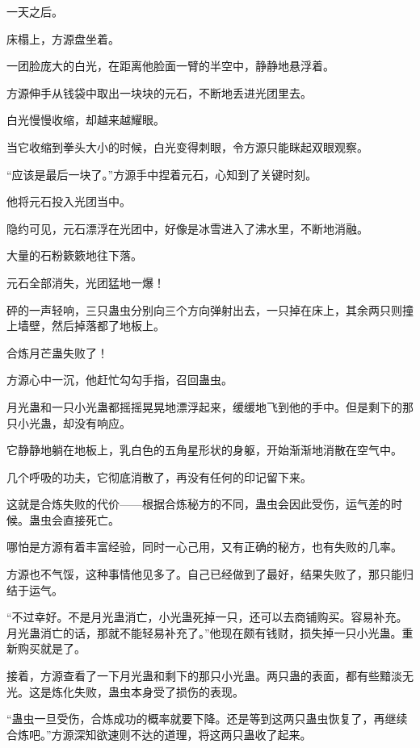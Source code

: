 
\begin{this_body}

一天之后。

床榻上，方源盘坐着。

一团脸庞大的白光，在距离他脸面一臂的半空中，静静地悬浮着。

方源伸手从钱袋中取出一块块的元石，不断地丢进光团里去。

白光慢慢收缩，却越来越耀眼。

当它收缩到拳头大小的时候，白光变得刺眼，令方源只能眯起双眼观察。

“应该是最后一块了。”方源手中捏着元石，心知到了关键时刻。

他将元石投入光团当中。

隐约可见，元石漂浮在光团中，好像是冰雪进入了沸水里，不断地消融。

大量的石粉簌簌地往下落。

元石全部消失，光团猛地一爆！

砰的一声轻响，三只蛊虫分别向三个方向弹射出去，一只掉在床上，其余两只则撞上墙壁，然后掉落都了地板上。

合炼月芒蛊失败了！

方源心中一沉，他赶忙勾勾手指，召回蛊虫。

月光蛊和一只小光蛊都摇摇晃晃地漂浮起来，缓缓地飞到他的手中。但是剩下的那只小光蛊，却没有响应。

它静静地躺在地板上，乳白色的五角星形状的身躯，开始渐渐地消散在空气中。

几个呼吸的功夫，它彻底消散了，再没有任何的印记留下来。

这就是合炼失败的代价——根据合炼秘方的不同，蛊虫会因此受伤，运气差的时候。蛊虫会直接死亡。

哪怕是方源有着丰富经验，同时一心己用，又有正确的秘方，也有失败的几率。

方源也不气馁，这种事情他见多了。自己已经做到了最好，结果失败了，那只能归结于运气。

“不过幸好。不是月光蛊消亡，小光蛊死掉一只，还可以去商铺购买。容易补充。月光蛊消亡的话，那就不能轻易补充了。”他现在颇有钱财，损失掉一只小光蛊。重新购买就是了。

接着，方源查看了一下月光蛊和剩下的那只小光蛊。两只蛊的表面，都有些黯淡无光。这是炼化失败，蛊虫本身受了损伤的表现。

“蛊虫一旦受伤，合炼成功的概率就要下降。还是等到这两只蛊虫恢复了，再继续合炼吧。”方源深知欲速则不达的道理，将这两只蛊收了起来。


\end{this_body}
